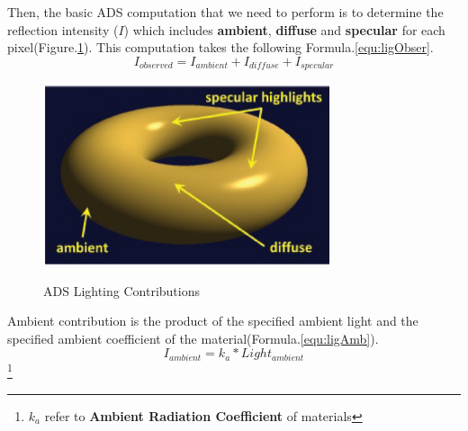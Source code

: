 \documentclass[12pt]{article}
\numberwithin{figure}{subsection}
\numberwithin{table}{subsection}
\numberwithin{equation}{subsection}
\begin{document}
Then, the basic ADS computation that we need to perform is to determine the
reflection intensity ($I$) which includes \textbf{ambient}, \textbf{diffuse} and \textbf{specular} for each pixel(Figure.\ref{fig:ASD}). 
This computation takes the following Formula.\ref{equ:ligObser}.
\begin{equation}\label{equ:ligObser}　
    I_{observed}=I_{ambient}+I_{diffuse}+I_{specular}
\end{equation}
\begin{figure}[!htbp]
	\centering
	\includegraphics[width=0.75\textwidth]{image/ASD.png}
	\caption{ADS Lighting Contributions}
    \label{fig:ASD}
    \cite{alma991002986248905076}
\end{figure}

Ambient contribution is the product of the specified ambient
light and the specified ambient coefficient of the material(Formula.\ref{equ:ligAmb}).
\begin{equation}\label{equ:ligAmb}　
    I_{ambient}=k_a*Light_{ambient}
\end{equation}\footnote{$k_a$ refer to \textbf{Ambient Radiation Coefficient} of materials} 
\end{document}
